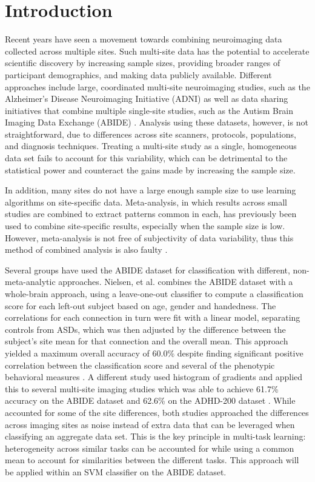 \documentclass{llncs}
\begin{document}
\section{Introduction}
Recent years have seen a movement towards combining neuroimaging data collected
across multiple sites. Such multi-site data has the potential to accelerate
scientific discovery by increasing sample sizes, providing broader ranges of
participant demographics, and making data publicly available. Different
approaches include large, coordinated multi-site neuroimaging studies, such as
the Alzheimer's Disease Neuroimaging Initiative (ADNI) \cite{adni} as well as
data sharing initiatives that combine multiple single-site studies, such as the
Autism Brain Imaging Data Exchange (ABIDE) \cite{abide}. Analysis using these
datasets, however, is not straightforward, due to differences across site
scanners, protocols, populations, and diagnosis techniques. Treating a
multi-site study as a single, homogeneous data set fails to account for this
variability, which can be detrimental to the statistical power and counteract
the gains made by increasing the sample size.

In addition, many sites do not have a large enough sample size to use learning
algorithms on site-specific data.  Meta-analysis, in which results across small
studies are combined to extract patterns common in each, has previously been
used to combine site-specific results, especially when the sample size is low.
However, meta-analysis is not free of subjectivity of data variability, thus
this method of combined analysis is also faulty \cite{meta}.

Several groups have used the ABIDE dataset for classification with different, non-meta-analytic approaches. Nielsen, et al. combines the ABIDE dataset with a whole-brain approach, using a leave-one-out classifier to compute a classification score for each left-out subject based on age, gender and handedness.  The correlations for each connection in turn were fit with a linear model, separating controls from ASDs, which was then adjusted by the difference between the subject's site mean for that connection and the overall mean.  This approach yielded a maximum overall accuracy of 60.0\% despite finding significant positive correlation between the classification score and several of the phenotypic behavioral measures \cite{Jared}. A different study used histogram of gradients and applied this to several multi-site imaging studies which was able to achieve 61.7\% accuracy on the ABIDE dataset and 62.6\% on the ADHD-200 dataset \cite{ghiassian}. While \cite{Jared} accounted for some of the site differences, both studies approached the differences across imaging sites as noise instead of extra data that can be leveraged when classifying an aggregate data set.
This is the key principle in multi-task learning: heterogeneity across similar tasks can be accounted for while using a common mean to account for similarities between the different tasks.  This approach will be applied within an SVM classifier on the ABIDE dataset.
\end{document}
